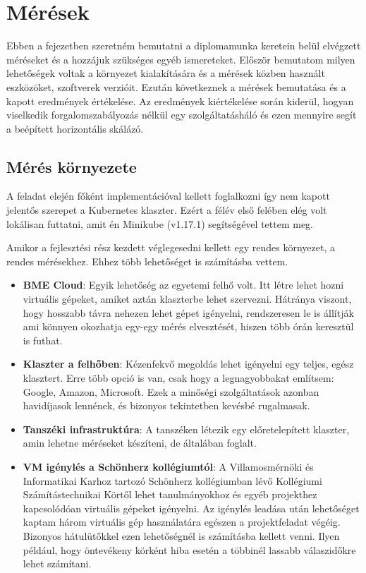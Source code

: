 \chapter{Mérések}
\label{sec:results}
Ebben a fejezetben szeretném bemutatni a diplomamunka keretein belül elvégzett méréseket és a hozzájuk szükséges egyéb ismereteket.
Először bemutatom milyen lehetőségek voltak a környezet kialakítására és a mérések közben használt eszközöket, szoftverek verzióit.
Ezután következnek a mérések bemutatása és a kapott eredmények értékelése.
Az eredmények kiértékelése során kiderül, hogyan viselkedik forgalomszabályozás nélkül egy szolgáltatásháló és ezen mennyire segít a beépített horizontális skálázó.

\section{Mérés környezete}
A feladat elején főként implementációval kellett foglalkozni így nem kapott jelentős szerepet a Kubernetes klaszter. Ezért  a félév első felében elég volt lokálisan futtatni, amit én Minikube (v1.17.1) segítségével tettem meg. 

Amikor a fejlesztési rész kezdett véglegesedni kellett egy rendes környezet, a rendes mérésekhez. Ehhez több lehetőséget is számításba vettem.	

\begin{itemize}
  \item \textbf{BME Cloud}: Egyik lehetőség az egyetemi felhő volt. Itt létre lehet hozni virtuális gépeket, amiket aztán klaszterbe lehet szervezni. Hátránya viszont, hogy hosszabb távra nehezen lehet gépet igényelni, rendszeresen le is állítják ami könnyen okozhatja egy-egy mérés elvesztését, hiszen több órán keresztül is futhat.
  \item \textbf{Klaszter a felhőben}: Kézenfekvő megoldás lehet igényelni egy teljes, egész klasztert. Erre több opció is van, csak hogy a legnagyobbakat említsem: Google, Amazon, Microsoft. Ezek a minőségi szolgáltatások azonban havidíjasok lennének, és bizonyos tekintetben kevésbé rugalmasak. %
    \item \textbf{Tanszéki infrastruktúra}: A tanszéken létezik egy előretelepített klaszter, amin lehetne méréseket készíteni, de általában foglalt.
      \item \textbf{VM igénylés a Schönherz kollégiumtól}: A Villamosmérnöki és Informatikai Karhoz tartozó Schönherz kollégiumban lévő Kollégiumi Számítástechnikai Körtől lehet tanulmányokhoz és egyéb projekthez kapcsolódóan virtuális gépeket igényelni. Az igénylés leadása után lehetőséget kaptam három virtuális gép használatára egészen a projektfeladat végéig. Bizonyos hátulütőkkel ezen lehetőségnél is számításba kellett venni. Ilyen például, hogy öntevékeny körként hiba esetén a többinél lassabb válaszidőkre lehet számítani.
\end{itemize}		

